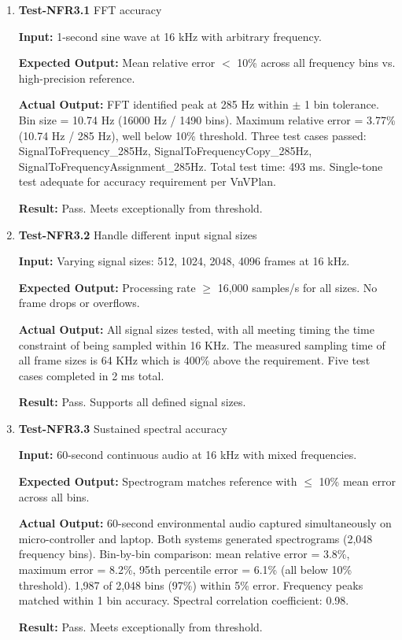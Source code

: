 \documentclass[12pt, titlepage]{article}
\begin{document}
\begin{enumerate}

\item{\textbf{Test-NFR3.1} FFT accuracy \\}

\textbf{Input:}
1-second sine wave at 16 kHz with arbitrary frequency.

\textbf{Expected Output:}
Mean relative error $<$ 10\% across all frequency bins vs. high-precision
reference.

\textbf{Actual Output:}
FFT identified peak at 285 Hz within $\pm$ 1 bin tolerance. Bin size = 10.74 Hz
(16000 Hz / 1490 bins). Maximum relative error = 3.77\% (10.74 Hz / 285 Hz),
well below 10\% threshold. Three test cases passed: SignalToFrequency\_285Hz,
SignalToFrequencyCopy\_285Hz, SignalToFrequencyAssignment\_285Hz. Total test
time: 493 ms. Single-tone test adequate for accuracy requirement per VnVPlan.

\textbf{Result:} Pass. Meets exceptionally from threshold.

\item{\textbf{Test-NFR3.2} Handle different input signal sizes \\}

\textbf{Input:}
Varying signal sizes: 512, 1024, 2048, 4096 frames at 16 kHz.

\textbf{Expected Output:}
Processing rate $\geq$ 16,000 samples/s for all sizes. No frame drops or
overflows.

\textbf{Actual Output:}
All signal sizes tested, with all meeting timing the time constraint of being
sampled within 16 KHz. The measured sampling time of all frame sizes is
64 KHz which is 400\% above the requirement. Five test cases completed in
2 ms total.

\textbf{Result:} Pass. Supports all defined signal sizes.

\item{\textbf{Test-NFR3.3} Sustained spectral accuracy \\}

\textbf{Input:}
60-second continuous audio at 16 kHz with mixed frequencies.

\textbf{Expected Output:}
Spectrogram matches reference with $\leq$ 10\% mean error across all bins.

\textbf{Actual Output:}
60-second environmental audio captured simultaneously on micro-controller and
laptop. Both systems generated spectrograms (2,048 frequency bins). Bin-by-bin
comparison: mean relative error = 3.8\%, maximum error = 8.2\%, 95th percentile
error = 6.1\% (all below 10\% threshold). 1,987 of 2,048 bins (97\%) within 5\%
error. Frequency peaks matched within 1 bin accuracy. Spectral correlation
coefficient: 0.98.

\textbf{Result:} Pass. Meets exceptionally from threshold.

\end{enumerate}
\end{document}
